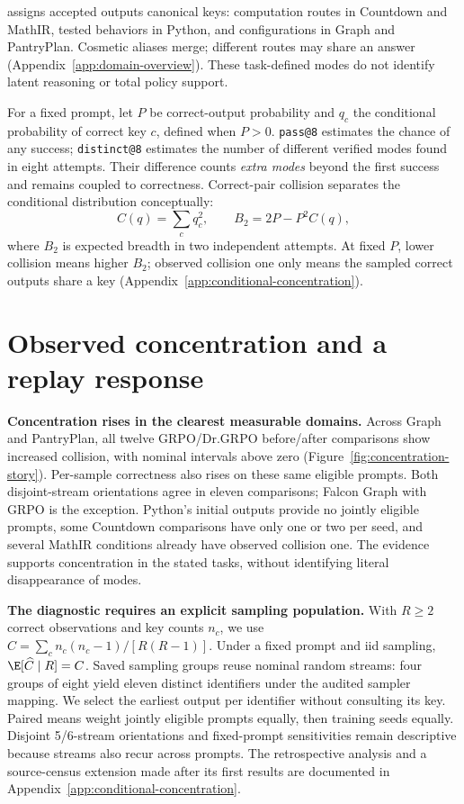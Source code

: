\href{https://huggingface.co/datasets/od2961/ModeBench}{\mb{}} assigns accepted
outputs canonical keys: computation routes in Countdown and MathIR, tested
behaviors in Python, and configurations in Graph and PantryPlan.
Cosmetic aliases merge; different routes may share an answer
(Appendix~\ref{app:domain-overview}). These task-defined modes do not identify
latent reasoning or total policy support.



For a fixed prompt, let $P$ be correct-output probability and $q_c$ the
conditional probability of correct key $c$, defined when $P>0$.
\texttt{pass@8} estimates the chance of any success; \texttt{distinct@8}
estimates the number of different verified modes found in eight attempts.
Their difference counts \emph{extra modes} beyond the first success and
remains coupled to correctness. Correct-pair collision separates the
conditional distribution conceptually:
\begin{equation}
 C(q)=\sum_c q_c^2,\qquad B_2=2P-P^2C(q),
 \label{eq:workshop-collision-bridge}
\end{equation}
where $B_2$ is expected breadth in two independent attempts.
At fixed $P$, lower collision means higher $B_2$; observed collision one
only means the sampled correct outputs share a key
(Appendix~\ref{app:conditional-concentration}).



\section{Observed concentration and a replay response}
\label{sec:collapse}\label{sec:method}\label{sec:replay}\label{sec:maxrl-method}
\textbf{Concentration rises in the clearest measurable domains.}
Across Graph and PantryPlan, all twelve GRPO/Dr.GRPO before/after comparisons
show increased collision, with nominal intervals above zero
(Figure~\ref{fig:concentration-story}). Per-sample correctness also rises on
these same eligible prompts. Both disjoint-stream orientations agree in
eleven comparisons; Falcon Graph with GRPO is the exception. Python's initial
outputs provide no jointly eligible prompts, some Countdown comparisons have
only one or two per seed, and several MathIR conditions already have observed
collision one. The evidence supports concentration in the stated tasks,
without identifying literal disappearance of modes.

\textbf{The diagnostic requires an explicit sampling population.}
With $R\ge2$ correct observations and key counts $n_c$, we use
$\widehat C=\sum_c n_c(n_c-1)/[R(R-1)]$. Under a fixed prompt and iid sampling,
$\E[\widehat C\mid R]=C$. Saved sampling groups reuse nominal random streams:
four groups of eight yield eleven distinct identifiers under the audited
sampler mapping. We select the earliest output per identifier without
consulting its key. Paired means weight jointly eligible prompts equally,
then training seeds equally. Disjoint 5/6-stream orientations and fixed-prompt
sensitivities remain descriptive because streams also recur across prompts.
The retrospective analysis and a source-census extension made after its first
results are documented in Appendix~\ref{app:conditional-concentration}.

